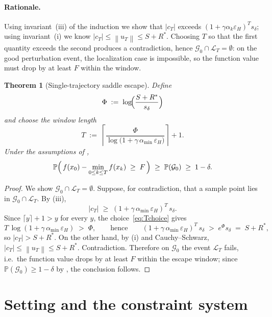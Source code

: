 \documentclass[11pt,a4paper]{article}
\theoremstyle{plain}
\newtheorem{theorem}{Theorem}
\theoremstyle{definition}
\newcommand{\norm}[1]{\left\|#1\right\|}
\newcommand{\eps}{\varepsilon}
\newcommand{\epsH}{\eps_{H}}
\newcommand{\sdel}{s_{\delta}}
\renewcommand{\Pr}{\mathbb{P}}
\newcommand{\Rstar}{R^{*}}
\newcommand{\amin}{\alpha_{\min}}
\begin{document}
\paragraph{Rationale.}
Using invariant~(iii) of the induction we show that $|c_{T}|$ exceeds
$(1+\gamma\alpha_k\epsH)^{T}\sdel$; using invariant~(i) we know
$|c_{T}|\le\norm{u_{T}}\le S+\Rstar$. Choosing $T$ so that the first quantity
exceeds the second produces a contradiction, hence
$\mathcal{G}_{0}\cap\mathcal{L}_{T}=\emptyset$: on the good perturbation event,
the localization case is impossible, so the function value must drop by at
least $F$ within the window.

\begin{theorem}[Single-trajectory saddle escape]\label{thm:escape-single}
Define
\begin{equation}\label{eq:Phi-def}
\Phi \;:=\; \log\!\Bigl(\frac{S+R^{*}}{\sdel}\Bigr)
\end{equation}
and choose the window length
\begin{equation}\label{eq:Tchoice}
T \;:=\; \left\lceil
\frac{\Phi}{\log\!\bigl(1+\gamma\,\amin\,\epsH\bigr)}
\right\rceil + 1.
\end{equation}
Under the assumptions of ,
\[
\Pr\Bigl(\,f(x_{0}) - \min_{0\le k\le T}f(x_{k}) \;\ge\; F\,\Bigr)
\;\ge\; \Pr(\mathcal{G}_{0}) \;\ge\; 1 - \delta.
\]
\end{theorem}

\begin{proof}
We show $\mathcal{G}_{0}\cap\mathcal{L}_{T} = \emptyset$. Suppose, for
contradiction, that a sample point lies in
$\mathcal{G}_{0}\cap\mathcal{L}_{T}$. By (iii),
\[
|c_{T}| \;\ge\; (1+\gamma\,\amin\,\epsH)^{T}\,\sdel .
\]
Since $\lceil y\rceil+1>y$ for every $y$, the choice~\eqref{eq:Tchoice} gives
\[
T\,\log(1+\gamma\,\amin\,\epsH) \;>\; \Phi,
\qquad\text{hence}\qquad
(1+\gamma\,\amin\,\epsH)^{T}\,\sdel \;>\; e^{\Phi}\sdel \;=\; S+R^{*},
\]
so $|c_{T}|>S+R^{*}$. On the other hand, by (i) and
Cauchy--Schwarz, $|c_{T}|\le\norm{u_{T}}\le S+R^{*}$. Contradiction.
Therefore on $\mathcal{G}_{0}$ the event $\mathcal{L}_{T}$ fails, i.e.\ the
function value drops by at least $F$ within the escape window; since
$\Pr(\mathcal{G}_{0})\ge1-\delta$ by , the
conclusion follows.
\end{proof}

\section{Setting and the constraint system}\label{sec:setting}
\end{document}
